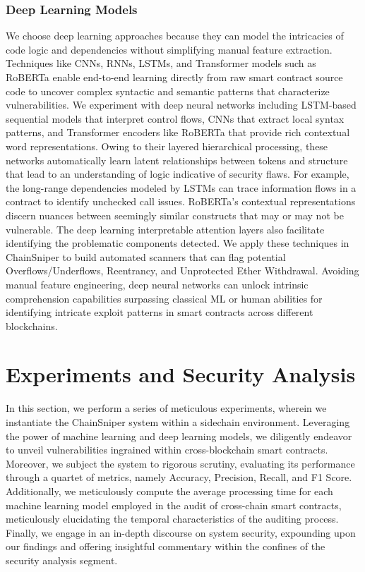 \documentclass[sigconf]{acmart}
\begin{document}
\subsubsection{Deep Learning Models}
We choose deep learning approaches because they can model the intricacies of code logic and dependencies without simplifying manual feature extraction. Techniques like CNNs, RNNs, LSTMs, and Transformer models such as RoBERTa enable end-to-end learning directly from raw smart contract source code to uncover complex syntactic and semantic patterns that characterize vulnerabilities. We experiment with deep neural networks including LSTM-based sequential models that interpret control flows, CNNs that extract local syntax patterns, and Transformer encoders like RoBERTa that provide rich contextual word representations. Owing to their layered hierarchical processing, these networks automatically learn latent relationships between tokens and structure that lead to an understanding of logic indicative of security flaws. For example, the long-range dependencies modeled by LSTMs can trace information flows in a contract to identify unchecked call issues. RoBERTa’s contextual representations discern nuances between seemingly similar constructs that may or may not be vulnerable. The deep learning interpretable attention layers also facilitate identifying the problematic components detected. We apply these techniques in ChainSniper to build automated scanners that can flag potential Overflows/Underflows, Reentrancy, and Unprotected Ether Withdrawal. Avoiding manual feature engineering, deep neural networks can unlock intrinsic comprehension capabilities surpassing classical ML or human abilities for identifying intricate exploit patterns in smart contracts across different blockchains.

\section{Experiments and Security Analysis}
In this section, we perform a series of meticulous experiments, wherein we instantiate the ChainSniper system within a sidechain environment. Leveraging the power of machine learning and deep learning models, we diligently endeavor to unveil vulnerabilities ingrained within cross-blockchain smart contracts. Moreover, we subject the system to rigorous scrutiny, evaluating its performance through a quartet of metrics, namely Accuracy, Precision, Recall, and F1 Score. Additionally, we meticulously compute the average processing time for each machine learning model employed in the audit of cross-chain smart contracts, meticulously elucidating the temporal characteristics of the auditing process. Finally, we engage in an in-depth discourse on system security, expounding upon our findings and offering insightful commentary within the confines of the security analysis segment.
\end{document}
